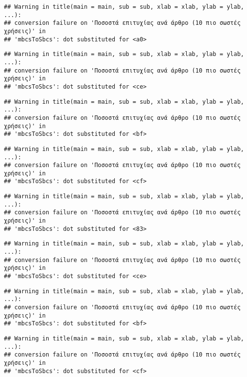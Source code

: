 \documentclass[
]{article}
\begin{document}
\begin{verbatim}
## Warning in title(main = main, sub = sub, xlab = xlab, ylab = ylab, ...):
## conversion failure on 'Ποσοστά επιτυχίας ανά άρθρο (10 πιο σωστές χρήσεις)' in
## 'mbcsToSbcs': dot substituted for <a0>
\end{verbatim}

\begin{verbatim}
## Warning in title(main = main, sub = sub, xlab = xlab, ylab = ylab, ...):
## conversion failure on 'Ποσοστά επιτυχίας ανά άρθρο (10 πιο σωστές χρήσεις)' in
## 'mbcsToSbcs': dot substituted for <ce>
\end{verbatim}

\begin{verbatim}
## Warning in title(main = main, sub = sub, xlab = xlab, ylab = ylab, ...):
## conversion failure on 'Ποσοστά επιτυχίας ανά άρθρο (10 πιο σωστές χρήσεις)' in
## 'mbcsToSbcs': dot substituted for <bf>
\end{verbatim}

\begin{verbatim}
## Warning in title(main = main, sub = sub, xlab = xlab, ylab = ylab, ...):
## conversion failure on 'Ποσοστά επιτυχίας ανά άρθρο (10 πιο σωστές χρήσεις)' in
## 'mbcsToSbcs': dot substituted for <cf>
\end{verbatim}

\begin{verbatim}
## Warning in title(main = main, sub = sub, xlab = xlab, ylab = ylab, ...):
## conversion failure on 'Ποσοστά επιτυχίας ανά άρθρο (10 πιο σωστές χρήσεις)' in
## 'mbcsToSbcs': dot substituted for <83>
\end{verbatim}

\begin{verbatim}
## Warning in title(main = main, sub = sub, xlab = xlab, ylab = ylab, ...):
## conversion failure on 'Ποσοστά επιτυχίας ανά άρθρο (10 πιο σωστές χρήσεις)' in
## 'mbcsToSbcs': dot substituted for <ce>
\end{verbatim}

\begin{verbatim}
## Warning in title(main = main, sub = sub, xlab = xlab, ylab = ylab, ...):
## conversion failure on 'Ποσοστά επιτυχίας ανά άρθρο (10 πιο σωστές χρήσεις)' in
## 'mbcsToSbcs': dot substituted for <bf>
\end{verbatim}

\begin{verbatim}
## Warning in title(main = main, sub = sub, xlab = xlab, ylab = ylab, ...):
## conversion failure on 'Ποσοστά επιτυχίας ανά άρθρο (10 πιο σωστές χρήσεις)' in
## 'mbcsToSbcs': dot substituted for <cf>
\end{verbatim}
\end{document}

